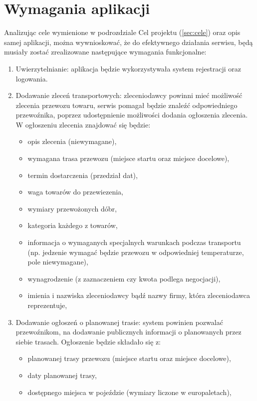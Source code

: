 \section{Wymagania aplikacji}
Analizując cele wymienione w podrozdziale Cel projektu (\ref{sec:cele}) oraz opis samej aplikacji, można wywnioskować, że do efektywnego działania serwisu, będą musiały zostać zrealizowane następujące wymagania funkcjonalne:
\begin{enumerate}
    \item Uwierzytelnianie: aplikacja będzie wykorzystywała system rejestracji oraz logowania.
    \item Dodawanie zleceń transportowych: zleceniodawcy powinni mieć możliwość zlecenia przewozu towaru, serwis pomagał będzie znaleźć odpowiedniego przewoźnika, poprzez udostępnienie możliwości dodania ogłoszenia zlecenia. W ogłoszeniu zlecenia znajdować się będzie:
    \begin{itemize}
        \item opis zlecenia (niewymagane),
        \item wymagana trasa przewozu (miejsce startu oraz miejsce docelowe),
        \item termin dostarczenia (przedział dat),
        \item waga towarów do przewiezenia,
        \item wymiary przewożonych dóbr,
        \item kategoria każdego z towarów,
        \item informacja o wymaganych specjalnych warunkach podczas transportu (np. jedzenie wymagać będzie przewozu w odpowiedniej temperaturze, pole niewymagane),
        \item wynagrodzenie (z zaznaczeniem czy kwota podlega negocjacji),
        \item imienia i nazwiska zleceniodawcy bądź nazwy firmy, która zleceniodawca reprezentuje,
    \end{itemize}
    \item Dodawanie ogłoszeń o planowanej trasie: system powinien pozwalać przewoźnikom, na dodawanie publicznych informacji o planowanych przez siebie trasach. Ogłoszenie będzie składało się z:
    \begin{itemize}
        \item planowanej trasy przewozu (miejsce startu oraz miejsce docelowe),
        \item daty planowanej trasy,
        \item dostępnego miejsca w pojeździe (wymiary liczone w europaletach),

\end{itemize}
\end{enumerate}

